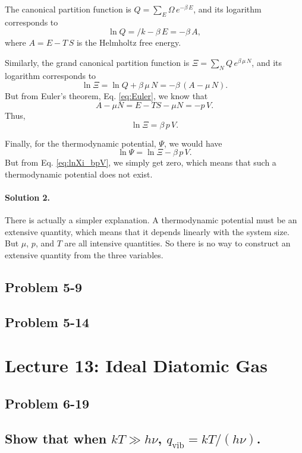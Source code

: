\documentclass[reprint]{revtex4-1}
\numberwithin{equation}{section}
\begin{document}
The canonical partition function is
$Q = \sum_E \Omega \, e^{-\beta \, E}$,
and its logarithm corresponds to
$$
\ln Q = /k - \beta \, E = -\beta \, A,
$$
where $A = E - T \, S$ is the Helmholtz free energy.

Similarly, the grand canonical partition function is
$\Xi = \sum_N Q \, e^{\beta \, \mu \, N}$,
and its logarithm corresponds to
$$
\ln \Xi = \ln Q + \beta \, \mu \, N = -\beta \, (A - \mu \, N).
$$
But from Euler's theorem, Eq. \eqref{eq:Euler}, we know that
$$
A - \mu N = E - T S - \mu N = -p \, V.
$$
Thus,
\begin{equation}
  \ln \Xi = \beta \, p \, V.
\label{eq:lnXi_bpV}
\end{equation}

Finally, for the thermodynamic potential, $\Psi$,
we would have
$$
\ln \Psi = \ln \Xi - \beta \, p \, V.
$$
But from Eq. \eqref{eq:lnXi_bpV},
we simply get zero,
which means that such a thermodynamic potential does not exist.

\paragraph*{Solution 2.}

There is actually a simpler explanation.
%
A thermodynamic potential must be an extensive quantity,
which means that it depends linearly with the system size.
%
But $\mu$, $p$, and $T$ are all intensive quantities.
%
So there is no way to construct an extensive quantity
from the three variables.


\subsection{Problem 5-9}


\subsection{Problem 5-14}


\section{Lecture 13: Ideal Diatomic Gas}

\subsection{Problem 6-19}

\subsection{Show that when $kT \gg h\nu$, $q_\mathrm{vib} = kT/(h\nu)$.}
\end{document}
